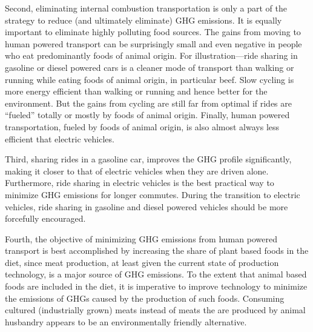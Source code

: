 \documentclass{article}[12pt,letterpaper]
\begin{document}
Second, eliminating internal combustion transportation is only a part of the strategy to reduce (and ultimately eliminate) GHG emissions. It is equally important to eliminate highly polluting food sources. The gains from moving to human powered transport can be surprisingly small and even negative in people who eat predominantly foods of animal origin. For illustration---ride sharing in gasoline or diesel powered cars is a cleaner mode of transport than walking or running while eating foods of animal origin, in particular beef. Slow cycling is more energy efficient than walking or running and hence better for the environment. But the gains from cycling are still far from optimal if rides are ``fueled'' totally or mostly by foods of animal origin. Finally, human powered transportation, fueled by foods of animal origin, is also almost always less efficient that electric vehicles.

Third, sharing rides in a gasoline car, improves the GHG profile significantly, making it closer to that of electric vehicles when they are driven alone. Furthermore, ride sharing in electric vehicles is the best practical way to minimize GHG emissions for longer commutes. During the transition to electric vehicles, ride sharing in gasoline and diesel powered vehicles should be more forcefully encouraged.

Fourth, the objective of minimizing GHG emissions from human powered transport is best accomplished by increasing the share of plant based foods in the diet, since meat production, at least given the current state of production technology, is a major source of GHG emissions. To the extent that animal based foods are included in the diet, it is imperative to improve technology to minimize the emissions of GHGs caused by the production of such foods. Consuming cultured (industrially grown) meats instead of meats the are produced by animal husbandry appears to be an environmentally friendly alternative. %
\end{document}
